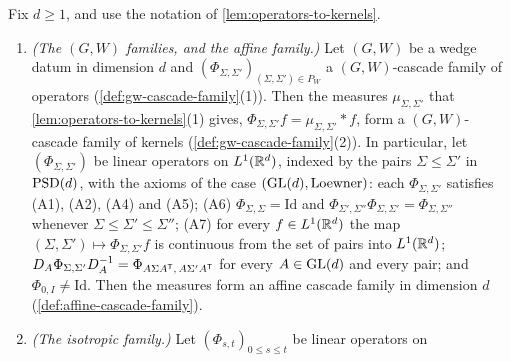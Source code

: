 \begin{lemma}
\label{lem:operators-to-kernels-families}
\leanok
Fix $d \ge 1$, and use the notation of \ref{lem:operators-to-kernels}.
\begin{enumerate}
\item[(4)] \emph{(The $(G, W)$ families, and the affine family.)} Let $(G, W)$ be a wedge datum in
dimension $d$ and $(\Phi_{\Sigma,\Sigma'})_{(\Sigma,\Sigma') \in P_W}$ a $(G, W)$-cascade family of
operators (\ref{def:gw-cascade-family}(1)). Then the measures $\mu_{\Sigma,\Sigma'}$ that
\ref{lem:operators-to-kernels}(1) gives, $\Phi_{\Sigma,\Sigma'}f = \mu_{\Sigma,\Sigma'} * f$, form a
$(G, W)$-cascade family of kernels (\ref{def:gw-cascade-family}(2)). In particular, let
$(\Phi_{\Sigma,\Sigma'})$ be linear operators on $L^1(\mathbb{R}^d)$, indexed by the pairs
$\Sigma \le \Sigma'$ in $\mathrm{PSD}(d)$, with the axioms of the case $(\mathrm{GL}(d), \text{Loewner})$: each
$\Phi_{\Sigma,\Sigma'}$ satisfies (A1), (A2), (A4) and (A5); (A6) $\Phi_{\Sigma,\Sigma} = \mathrm{Id}$ and
$\Phi_{\Sigma',\Sigma''}\Phi_{\Sigma,\Sigma'} = \Phi_{\Sigma,\Sigma''}$ whenever
$\Sigma \le \Sigma' \le \Sigma''$; (A7) for every $f \in L^1(\mathbb{R}^d)$ the map
$(\Sigma,\Sigma') \mapsto \Phi_{\Sigma,\Sigma'}f$ is continuous from the set of pairs into
$L^1(\mathbb{R}^d)$; $D_A\Phi_{\Sigma,\Sigma'}D_A^{-1} = \Phi_{A\Sigma A^{\mathsf{T}},\,A\Sigma'A^{\mathsf{T}}}$ for
every $A \in \mathrm{GL}(d)$ and every pair; and $\Phi_{0,I} \ne \mathrm{Id}$. Then the measures form an
affine cascade family in dimension $d$ (\ref{def:affine-cascade-family}).
\item[(5)] \emph{(The isotropic family.)} Let $(\Phi_{s,t})_{0 \le s \le t}$ be linear operators on

\end{enumerate}
\end{lemma}

